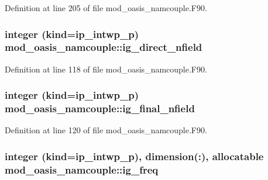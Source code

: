 Definition at line 205 of file mod\+\_\+oasis\+\_\+namcouple.\+F90.

\hypertarget{classmod__oasis__namcouple_a531825c07a164f6139e5eebd59e295a2}{
\subsubsection[{ig\+\_\+direct\+\_\+nfield}]{\setlength{\rightskip}{0pt plus 5cm}integer (kind=ip\+\_\+intwp\+\_\+p) mod\+\_\+oasis\+\_\+namcouple\+::ig\+\_\+direct\+\_\+nfield\hspace{0.3cm}{\ttfamily [private]}}}\label{classmod__oasis__namcouple_a531825c07a164f6139e5eebd59e295a2}


Definition at line 118 of file mod\+\_\+oasis\+\_\+namcouple.\+F90.

\hypertarget{classmod__oasis__namcouple_a7cf04d6fb678ee65b7fbedc56a0d680a}{
\subsubsection[{ig\+\_\+final\+\_\+nfield}]{\setlength{\rightskip}{0pt plus 5cm}integer (kind=ip\+\_\+intwp\+\_\+p) mod\+\_\+oasis\+\_\+namcouple\+::ig\+\_\+final\+\_\+nfield\hspace{0.3cm}{\ttfamily [private]}}}\label{classmod__oasis__namcouple_a7cf04d6fb678ee65b7fbedc56a0d680a}


Definition at line 120 of file mod\+\_\+oasis\+\_\+namcouple.\+F90.

\hypertarget{classmod__oasis__namcouple_affa727bb033c0f4d09962f2b4d1b4ab5}{
\subsubsection[{ig\+\_\+freq}]{\setlength{\rightskip}{0pt plus 5cm}integer (kind=ip\+\_\+intwp\+\_\+p), dimension(\+:), allocatable mod\+\_\+oasis\+\_\+namcouple\+::ig\+\_\+freq\hspace{0.3cm}{\ttfamily [private]}}}\label{classmod__oasis__namcouple_affa727bb033c0f4d09962f2b4d1b4ab5}


